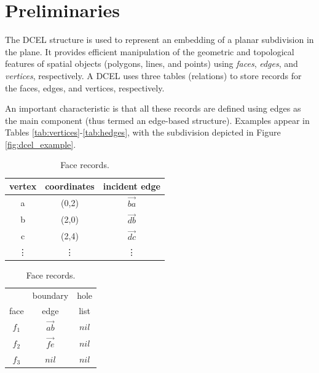 \section{Preliminaries} \label{sec:prelim}

The DCEL \cite{muller_finding_1978} structure is used to represent an embedding of a planar subdivision in the plane. It provides efficient manipulation of the geometric and topological features of spatial objects (polygons, lines, and points) using \textit{faces}, \textit{edges}, and \textit{vertices}, respectively. A DCEL uses three tables (relations) to store records for the faces, edges, and vertices, respectively. 

An important characteristic is that all these records are defined using edges as the main component (thus termed an edge-based structure). Examples appear in Tables \ref{tab:vertices}-\ref{tab:hedges}, with the subdivision depicted in Figure \ref{fig:dcel_example}.

\begin{table} %
\begin{minipage}{0.49\textwidth}
    \small
    \centering
    \caption{Vertex records.}\label{tab:vertices}
    \begin{tabular}{c c c}
        \toprule
        vertex & coordinates & incident edge \\
        \midrule
        a      & (0,2)  & $\vec{ba}$ \\
        b      & (2,0)  & $\vec{db}$ \\
        c      & (2,4)  & $\vec{dc}$ \\
        \vdots & \vdots & \vdots     \\
        \bottomrule
    \end{tabular}
\end{minipage}\hfill %
\begin{minipage}{0.49\textwidth}
    \small
    \centering
    \caption{Face records.}\label{tab:faces}
    \begin{tabular}{c c c} 
        \toprule
             & boundary  & hole\\
        face & edge      & list\\
        \midrule
        $f_1$ & $\vec{ab}$ & $nil$ \\
        $f_2$ & $\vec{fe}$ & $nil$ \\
        $f_3$ & $nil$      & $nil$ \\
        \bottomrule
    \end{tabular}
\end{minipage}
\end{table}

